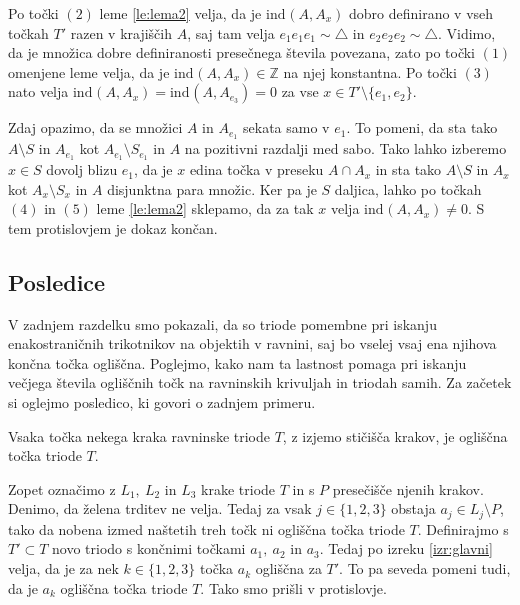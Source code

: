 \documentclass[mat1]{fmfdelo}
\newcommand{\Z}{\mathbb Z}
\newcommand{\ind}[3][]{\text{ind}_{#1}(#2, #3)}
\begin{document}
Po točki $(2)$ leme \ref{le:lema2} velja, da je $\ind{A}{A_x}$ dobro definirano v vseh točkah $T'$ razen v krajiščih $A$, saj tam velja $e_1e_1e_1 \sim \triangle$ in $e_2e_2e_2 \sim \triangle$. Vidimo, da je množica dobre definiranosti presečnega števila povezana, zato po točki $(1)$ omenjene leme velja, da je $\ind{A}{A_x} \in \Z$ na njej konstantna. Po točki $(3)$ nato velja $\ind{A}{A_x} = \ind{A}{A_{e_3}} = 0$ za vse $x \in T' \setminus \{e_1, e_2\}$.

Zdaj opazimo, da se množici $A$ in $A_{e_1}$ sekata samo v $e_1$. To pomeni, da sta tako $A\setminus S$ in $A_{e_1}$ kot $A_{e_1}\setminus S_{e_1}$ in $A$ na pozitivni razdalji med sabo. Tako lahko izberemo $x \in S$ dovolj blizu $e_1$, da je $x$ edina točka v preseku $A \cap A_x$ in sta tako $A\setminus S$ in $A_x$ kot $A_x \setminus S_x$ in $A$ disjunktna para množic. Ker pa je $S$ daljica, lahko po točkah $(4)$ in $(5)$ leme \ref{le:lema2} sklepamo, da za tak $x$ velja $\ind{A}{A_x} \neq 0$. S tem protislovjem je dokaz končan.
\endproof

\subsection{Posledice}
V zadnjem razdelku smo pokazali, da so triode pomembne pri iskanju enakostraničnih trikotnikov na objektih v ravnini, saj bo vselej vsaj ena njihova končna točka ogliščna. Poglejmo, kako nam ta lastnost pomaga pri iskanju večjega števila ogliščnih točk na ravninskih krivuljah in triodah samih. Za začetek si oglejmo posledico, ki govori o zadnjem primeru.
\begin{posledica}\label{posl:trioda}
Vsaka točka nekega kraka ravninske triode $T$, z izjemo stičišča krakov, je ogliščna točka triode $T$.
\end{posledica}

\proof
Zopet označimo z $L_1,\ L_2$ in $L_3$ krake triode $T$ in s $P$ presečišče njenih krakov. Denimo, da želena trditev ne velja. Tedaj za vsak $j \in \{1, 2, 3\}$ obstaja $a_j \in L_j \setminus P$, tako da nobena izmed naštetih treh točk ni ogliščna točka triode $T$. Definirajmo s $T' \subset T$ novo triodo s končnimi točkami $a_1,\ a_2$ in $a_3$. Tedaj po izreku \ref{izr:glavni} velja, da je za nek $k \in \{1, 2, 3\}$ točka $a_k$ ogliščna za $T'$. To pa seveda pomeni tudi, da je $a_k$ ogliščna točka triode $T$. Tako smo prišli v protislovje.
\endproof
\end{document}
